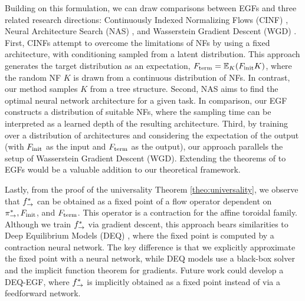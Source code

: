 \documentclass{article}
\theoremstyle{plain}
\theoremstyle{definition}
\theoremstyle{remark}
\theoremstyle{fact}
\begin{document}
Building on this formulation, we can draw comparisons between EGFs and three related research directions: Continuously Indexed Normalizing Flows (CINF) \cite{caterini2021variational}, Neural Architecture Search (NAS) \cite{elsken2019neural}, and Wasserstein Gradient Descent (WGD) \cite{NEURIPS2018_a1afc58c}. First, CINFs attempt to overcome the limitations of NFs by using a fixed architecture, with conditioning sampled from a latent distribution. This approach generates the target distribution as an expectation, $F_{\mathrm{term}}=\mathbb E_K(F_{\mathrm{init}} K)$, where the random NF $K$ is drawn from a continuous distribution of NFs. In contrast, our method samples $K$ from a tree structure. Second, NAS aims to find the optimal neural network architecture for a given task. In comparison, our EGF constructs a distribution of suitable NFs, where the sampling time can be interpreted as a learned depth of the resulting architecture. Third, by training over a distribution of architectures and considering the expectation of the output (with $F_{\mathrm{init}}$ as the input and $F_{\mathrm{term}}$ as the output), our approach parallels the setup of Wasserstein Gradient Descent (WGD). Extending the theorems of \citet{NEURIPS2018_a1afc58c} to EGFs would be a valuable addition to our theoretical framework.

Lastly, from the proof of the universality Theorem \ref{theo:universality}, we observe that $f^*_{\rightarrow}$ can be obtained as a fixed point of a flow operator dependent on $\pi_{\rightarrow}^*, F_{\mathrm{init}}$, and $F_{\mathrm{term}}$. This operator is a contraction for the affine toroidal family. Although we train $f^*_{\rightarrow}$ via gradient descent, this approach bears similarities to Deep Equilibrium Models (DEQ) \cite{bai2019deep, bai2020multiscale}, where the fixed point is computed by a contraction neural network. The key difference is that we explicitly approximate the fixed point with a neural network, while DEQ models use a black-box solver and the implicit function theorem for gradients. Future work could develop a DEQ-EGF, where $f^*_{\rightarrow}$ is implicitly obtained as a fixed point instead of via a feedforward network.




\end{document}
